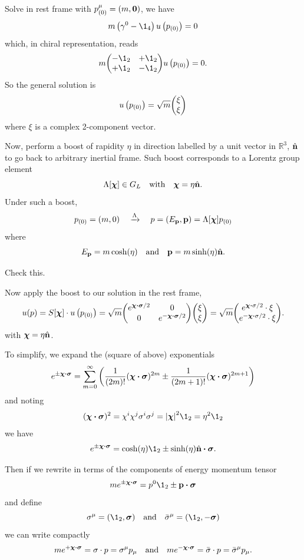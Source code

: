 \documentclass[a4paper,11pt]{article}
\begin{document}
	Solve in rest frame with $p^\mu _{(0)} = (m, \vb 0)$, we have 
	\[
		m \left( \gamma^0 - \1_4 \right) u\left(p _{(0)}\right) = 0
	\]
	which, in chiral representation, reads 
	\[
		m \mqty(- \1_2 & +\1_2\\ + \1_2 & - \1_2) u \left(p _{(0)}\right) = 0.
	\]
	So the general solution is 
	\[
		u\left( p _{(0)} \right) = \sqrt{m} \mqty(\xi\\ \xi)
	\]
	where $\xi$ is a complex 2-component vector.

	Now, perform a boost of rapidity $\eta$ in direction labelled by a unit vector in $\mathbb{R}^3$, $\hat{\vb n}$ to go back to arbitrary inertial frame. Such boost corresponds to a Lorentz group element
	\[
		\Lambda[\bm \chi] \in G_L \quad \text{with} \quad \bm \chi = \eta \hat{\vb n}.
	\]
	Under such a boost,
	\[
		p _{(0)} = (m,0) \quad \xrightarrow{\Lambda} \quad p = (E _{\vb p}, \vb p) = \Lambda[\bm \chi] p _{(0)}
	\]
	where
	\[
		E _{\vb p} = m \cosh(\eta) \quad \text{and} \quad \vb p = m \sinh(\eta) \hat{\vb n}.
	\]
	\begin{exer}
		Check this.
	\end{exer}

	Now apply the boost to our solution in the rest frame,
	\[
		u(p) = S[\bm \chi] \cdot u\left( p _{(0)} \right) = \sqrt{m} \mqty(e ^{\bm \chi \vdot \bm \sigma/2} & 0 \\ 0 & e ^{- \bm \chi \vdot \bm \sigma/2}) \mqty(\xi \\ \xi) = \sqrt{m} \mqty(e ^{\bm \chi \vdot \sigma/2} \cdot \xi\\e ^{-\bm \chi \vdot \sigma/2} \cdot \xi).
	\]
	with $\bm \chi = \eta \hat{\vb n}$.

	To simplify, we expand the (square of above) exponentials
	\[
		e ^{\pm \bm \chi \vdot \bm \sigma} = \sum _{m = 0}^{\infty} \left( \frac{1}{(2m)!} (\bm \chi \vdot\bm \sigma)^{2m} \pm \frac{1}{(2m+1)!} (\bm \chi \vdot \bm \sigma)^{2m + 1} \right)
	\]
	and noting 
	\[
		(\bm \chi \vdot \bm \sigma)^2 = \chi^i \chi^j \sigma^i \sigma^j = \abs{\bm \chi}^2 \1_2 = \eta^2 \1_2
	\]
	we have
	\[
		e ^{\pm \bm \chi \vdot \bm \sigma} = \cosh(\eta) \1_2 \pm \sinh(\eta) \hat{\vb n} \vdot \bm \sigma.
	\]

	Then if we rewrite in terms of the components of energy momentum tensor
	\[
		m e ^{\pm \bm \chi \vdot \bm \sigma} = p^0 \1_2 \pm \vb p \vdot \bm \sigma
	\]
	and define
	\[
		\sigma^\mu = (\1_2, \bm \sigma) \quad \text{and} \quad \bar \sigma^\mu = (\1_2, - \bm \sigma)
	\]
	we can write compactly
	\[
		m e ^{+\bm \chi \vdot \bm \sigma} = \sigma \cdot p = \sigma^\mu p_\mu \quad \text{and} \quad m e ^{-\bm \chi \vdot \bm \sigma} = \bar \sigma \cdot p = \bar \sigma^\mu p_\mu.
	\]
	
\end{document}
